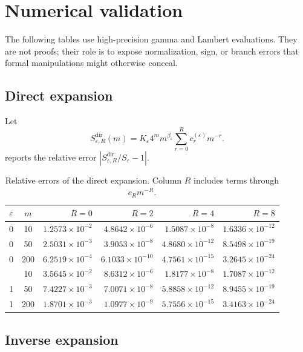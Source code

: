 \documentclass[11pt,a4paper]{article}
\theoremstyle{clean}
\theoremstyle{definition}
\newcommand{\eps}{\varepsilon}
\newcommand{\be}{\beta}
\begin{document}
\section{Numerical validation}
\label{sec:numerics}

The following tables use high-precision gamma and Lambert evaluations.  They are not proofs; their role is to expose normalization, sign, or branch errors that formal manipulations might otherwise conceal.

\subsection{Direct expansion}

Let
\begin{equation}
 S_{\eps,R}^{\mathrm{dir}}(m)=K_\eps4^m m^{\be_\eps}
 \sum_{r=0}^{R}c_r^{(\eps)}m^{-r}.
 \label{eq:direct-trunc}
\end{equation}
 reports the relative error
\(\left|S_{\eps,R}^{\mathrm{dir}}/S_\eps-1\right|\).

\begin{table}[htbp]
\centering
\caption{Relative errors of the direct expansion.  Column \(R\) includes terms through \(c_Rm^{-R}\).}
\label{tab:direct-errors}
\small
\begin{tabular}{@{}ccrrrr@{}}
\toprule
\(\eps\)&\(m\)&\(R=0\)&\(R=2\)&\(R=4\)&\(R=8\)\\
\midrule
0&10  &\(1.2573\!\times10^{-2}\)&\(4.8642\!\times10^{-6}\)&\(1.5087\!\times10^{-8}\)&\(1.6336\!\times10^{-12}\)\\
0&50  &\(2.5031\!\times10^{-3}\)&\(3.9053\!\times10^{-8}\)&\(4.8680\!\times10^{-12}\)&\(8.5498\!\times10^{-19}\)\\
0&200 &\(6.2519\!\times10^{-4}\)&\(6.1033\!\times10^{-10}\)&\(4.7561\!\times10^{-15}\)&\(3.2645\!\times10^{-24}\)\\
\addlinespace
1&10  &\(3.5645\!\times10^{-2}\)&\(8.6312\!\times10^{-6}\)&\(1.8177\!\times10^{-8}\)&\(1.7087\!\times10^{-12}\)\\
1&50  &\(7.4227\!\times10^{-3}\)&\(7.0071\!\times10^{-8}\)&\(5.8858\!\times10^{-12}\)&\(8.9455\!\times10^{-19}\)\\
1&200 &\(1.8701\!\times10^{-3}\)&\(1.0977\!\times10^{-9}\)&\(5.7556\!\times10^{-15}\)&\(3.4163\!\times10^{-24}\)\\
\bottomrule
\end{tabular}
\end{table}

\subsection{Inverse expansion}
\end{document}
